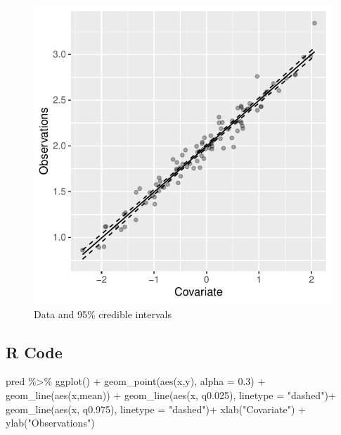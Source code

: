 \documentclass[
  letterpaper,
  DIV=11,
  numbers=noendperiod]{scrartcl}
\newenvironment{Shaded}{\begin{snugshade}}{\end{snugshade}}
\newcommand{\AttributeTok}[1]{\textcolor[rgb]{0.40,0.45,0.13}{#1}}
\newcommand{\FloatTok}[1]{\textcolor[rgb]{0.68,0.00,0.00}{#1}}
\newcommand{\FunctionTok}[1]{\textcolor[rgb]{0.28,0.35,0.67}{#1}}
\newcommand{\NormalTok}[1]{\textcolor[rgb]{0.00,0.23,0.31}{#1}}
\newcommand{\SpecialCharTok}[1]{\textcolor[rgb]{0.37,0.37,0.37}{#1}}
\newcommand{\StringTok}[1]{\textcolor[rgb]{0.13,0.47,0.30}{#1}}
\begin{document}
\begin{figure}[H]

{\centering \includegraphics{day1_practical_files/figure-pdf/unnamed-chunk-11-1.pdf}

}

\caption{Data and 95\% credible intervals}

\end{figure}%

\subsection{R Code}

\begin{Shaded}
\begin{Highlighting}[]
\NormalTok{pred }\SpecialCharTok{\%\textgreater{}\%} \FunctionTok{ggplot}\NormalTok{() }\SpecialCharTok{+} 
  \FunctionTok{geom\_point}\NormalTok{(}\FunctionTok{aes}\NormalTok{(x,y), }\AttributeTok{alpha =} \FloatTok{0.3}\NormalTok{) }\SpecialCharTok{+}
  \FunctionTok{geom\_line}\NormalTok{(}\FunctionTok{aes}\NormalTok{(x,mean)) }\SpecialCharTok{+}
  \FunctionTok{geom\_line}\NormalTok{(}\FunctionTok{aes}\NormalTok{(x, q0}\FloatTok{.025}\NormalTok{), }\AttributeTok{linetype =} \StringTok{"dashed"}\NormalTok{)}\SpecialCharTok{+}
  \FunctionTok{geom\_line}\NormalTok{(}\FunctionTok{aes}\NormalTok{(x, q0}\FloatTok{.975}\NormalTok{), }\AttributeTok{linetype =} \StringTok{"dashed"}\NormalTok{)}\SpecialCharTok{+}
  \FunctionTok{xlab}\NormalTok{(}\StringTok{"Covariate"}\NormalTok{) }\SpecialCharTok{+} \FunctionTok{ylab}\NormalTok{(}\StringTok{"Observations"}\NormalTok{)}
\end{Highlighting}
\end{Shaded}
\end{document}
